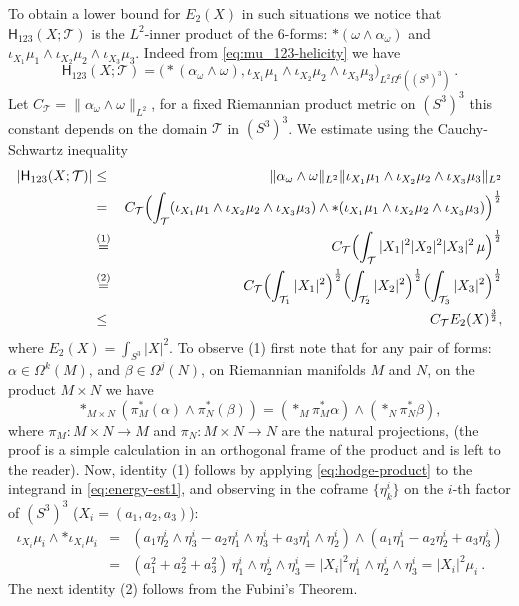 \documentclass[12pt]{article}
\begin{document}
 To obtain a lower bound for $E_2(X)$ in such situations we notice that 
$\mathsf{H}_{123}(X;\mathcal{T})$ is the $L^2$-inner product of the $6$-forms:
$\ast(\omega\wedge\alpha_\omega)$ and $\iota_{X_1}\mu_1\wedge \iota_{X_2}\mu_2\wedge \iota_{X_3}\mu_3$.
Indeed from \eqref{eq:mu_123-helicity} we have
\[
 \mathsf{H}_{123}(X;\mathcal{T})=\bigl(\ast(\alpha_\omega\wedge \omega),\iota_{X_1}\mu_1\wedge \iota_{X_2}\mu_2\wedge \iota_{X_3}\mu_3\bigr)_{L^2\Omega^6((S^3)^3)}\ .
\]
Let $C_\mathcal{T}=\|\alpha_\omega\wedge \omega\|_{L^2}$, for a fixed Riemannian product metric on $(S^3)^3$ this constant depends on the domain $\mathcal{T}$ in $(S^3)^3$. We estimate using the Cauchy-Schwartz inequality
\begin{eqnarray}
\notag |\mathsf{H}_{123}(X;\mathcal{T})| & \leq & \|\alpha_\omega\wedge \omega\|_{L^2}\|\iota_{X_1}\mu_1\wedge \iota_{X_2}\mu_2\wedge \iota_{X_3}\mu_3\|_{L^2}\\
\label{eq:energy-est1} & = & C_\mathcal{T}\Bigl(\int_{\mathcal{T}}(\iota_{X_1}\mu_1\wedge \iota_{X_2}\mu_2\wedge \iota_{X_3}\mu_3)\wedge \ast(\iota_{X_1}\mu_1\wedge \iota_{X_2}\mu_2\wedge \iota_{X_3}\mu_3)\Bigr)^\frac{1}{2}\\
\notag & \stackrel{(1)}{=} & C_\mathcal{T}\Bigl(\int_{\mathcal{T}}|X_1|^2|X_2|^2|X_3|^2\,\mu\Bigr)^\frac{1}{2}\\
\notag & \stackrel{(2)}{=} & C_\mathcal{T}\Bigl(\int_{\mathcal{T}_1}|X_1|^2\Bigr)^\frac{1}{2}\Bigl(\int_{\mathcal{T}_2}|X_2|^2\Bigr)^\frac{1}{2}\Bigl(\int_{\mathcal{T}_3}|X_3|^2\Bigr)^\frac{1}{2}\\
\label{eq:energy-est} & \leq &   C_\mathcal{T} E_2(X)^\frac{3}{2},
\end{eqnarray}
where $E_2(X)=\int_{S^3} |X|^2$.
To observe (1) first note that for any pair of forms: $\alpha\in \Omega^k(M)$, and $\beta\in \Omega^j(N)$, on Riemannian manifolds $M$ and $N$, on the product $M\times N$ we have  \begin{equation}\label{eq:hodge-product}
  \ast_{M\times N}(\pi^\ast_M(\alpha)\wedge \pi^\ast_N(\beta))=(\ast_M \pi^\ast_M \alpha)\wedge (\ast_N \pi^\ast_N \beta),
 \end{equation}
where $\pi_M:M\times N\longrightarrow M$ and $\pi_N:M\times N\longrightarrow N$ are the natural projections, (the proof is a simple calculation in an orthogonal frame of the product and is left to the reader).
Now, identity (1) follows by applying \eqref{eq:hodge-product} to the integrand in \eqref{eq:energy-est1}, and observing in the coframe $\{\eta^i_k\}$ on the $i$-th factor of $(S^3)^3$
 ($X_i=(a_1,a_2,a_3)$):
\begin{eqnarray*}
 \iota_{X_i}\mu_i\wedge \ast \iota_{X_i}\mu_i & = & (a_1\eta^i_2\wedge\eta^i_3-a_2\eta^i_1\wedge\eta^i_3+a_3\eta^i_1\wedge\eta^i_2)\wedge (a_1\eta^i_1-a_2\eta^i_2+a_3\eta^i_3)\\
 & = & (a^2_1+a^2_2+a^2_3)\, \eta^i_1\wedge\eta^i_2\wedge\eta^i_3 = |X_i |^2 \eta^i_1\wedge\eta^i_2\wedge\eta^i_3=|X_i |^2 \mu_i\ .
\end{eqnarray*}
The next identity (2) follows from the Fubini's Theorem.
\end{document}

